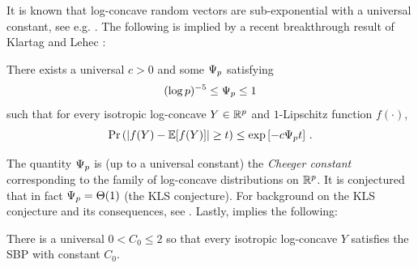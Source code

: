\documentclass[times,sort&compress,3p]{elsarticle}
\newcommand{\Revision}[1]{{#1}}
\begin{document}
\Revision{It is known that log-concave random vectors are sub-exponential with a universal constant, see e.g. \cite{brazitikos2014geometry}.}
The following 
is implied by a recent breakthrough result of 
Klartag and Lehec \cite[Theorem 1.1]{klartag2022bourgain}: 
\begin{lemma}\label{lem:log-concave-lip-concentration}
    There exists a universal $c>0$ and some
    $\Psi_p$ satisfying
    \begin{equation}
        \label{eq:cheeger-bound-main-paper}
         (\log p)^{-5}
        \le \Psi_p \le 1  
    \end{equation}
    such that for every
     isotropic log-concave $Y\in \mathbb{R}^p$ and $1$-Lipschitz function $f(\cdot)$,
    \begin{equation}
        \Pr\left( \left| f(Y)-{\mathbb{E}}[f(Y)]\right| \ge t \right) \le \exp\left[-c\Psi_p t\right] \,.
    \end{equation}
\end{lemma}
The quantity $\Psi_p$ is (up to a universal constant) the \emph{Cheeger constant} corresponding to the family of log-concave distributions on $\mathbb{R}^p$. 
It is conjectured \cite{kannan1995isoperimetric} that in fact $\Psi_p=\Theta(1)$ (the KLS conjecture).
For background on the KLS conjecture and its consequences, see \cite{lee2018stochastic,chen2021almost}.
Lastly, 
\cite[Lemma 5.5]{lovasz2007geometry} implies the following:
\begin{lemma}\label{lem:logconcave-smallball}
    There is a universal $0<C_0\le 2$ so that every isotropic log-concave $Y$ satisfies the SBP with constant $C_0$.
\end{lemma}
\end{document}
